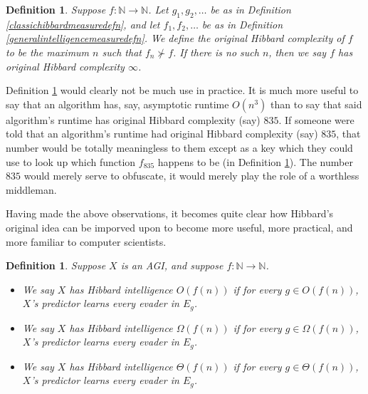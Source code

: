 \documentclass{article}
\newtheorem{definition}[theorem]{Definition}
\begin{document}
\begin{definition}
\label{originalhibbardcomplexitydefn}
    Suppose $f:\mathbb N\to\mathbb N$.
    Let $g_1,g_2,\ldots$ be as in Definition \ref{classichibbardmeasuredefn}, and let
    $f_1,f_2,\ldots$ be as in Definition \ref{generalintelligencemeasuredefn}.
    We define the \emph{original Hibbard complexity}
    of $f$ to be the maximum $n$ such that $f_n\not\succ f$. If there is no such
    $n$, then we say $f$ \emph{has original Hibbard complexity $\infty$}.
\end{definition}

Definition \ref{originalhibbardcomplexitydefn} would clearly not be much use in
practice. It is much more useful to say that an algorithm has, say, asymptotic
runtime $O(n^3)$ than to say that said algorithm's runtime has original Hibbard
complexity (say) $835$. If someone were told that an algorithm's runtime had
original Hibbard complexity (say) $835$, that number would be totally meaningless
to them except as a key which they could use to look up which function $f_{835}$
happens to be (in Definition \ref{originalhibbardcomplexitydefn}). The number
$835$ would merely serve to obfuscate, it would merely play the role of a worthless
middleman.

Having made the above observations, it becomes quite clear how Hibbard's original
idea can be imporved upon to become more useful, more practical, and more familiar
to computer scientists.

\begin{definition}
\label{bigointelligencedefn}
    Suppose $X$ is an AGI, and suppose $f:\mathbb N\to\mathbb N$.
    \begin{itemize}
        \item
        We say \emph{$X$ has Hibbard intelligence $O(f(n))$} if for
        every $g\in O(f(n))$, $X$'s predictor learns every evader in
        $E_g$.
        \item
        We say \emph{$X$ has Hibbard intelligence $\Omega(f(n))$} if for
        every $g\in \Omega(f(n))$, $X$'s predictor learns every evader in
        $E_g$.
        \item
        We say \emph{$X$ has Hibbard intelligence $\Theta(f(n))$} if for
        every $g\in\Theta(f(n))$, $X$'s predictor learns every evader in $E_g$.
    \end{itemize}
\end{definition}
\end{document}
